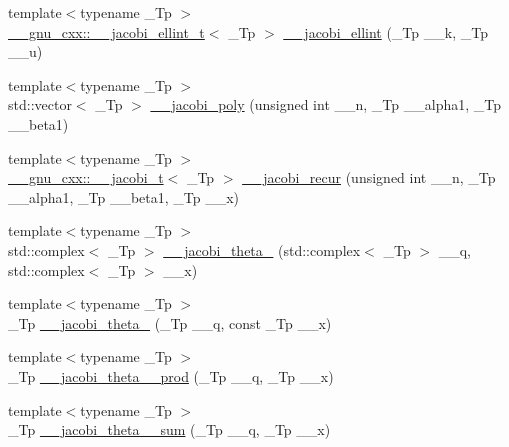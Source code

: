 \begin{DoxyCompactItemize}
\item 
{\footnotesize template$<$typename \+\_\+\+Tp $>$ }\\\hyperlink{struct____gnu__cxx_1_1____jacobi__ellint__t}{\+\_\+\+\_\+gnu\+\_\+cxx\+::\+\_\+\+\_\+jacobi\+\_\+ellint\+\_\+t}$<$ \+\_\+\+Tp $>$ \hyperlink{namespacestd_1_1____detail_a9530210ed172894f6a2e2bf4ef7fd47d}{\+\_\+\+\_\+jacobi\+\_\+ellint} (\+\_\+\+Tp \+\_\+\+\_\+k, \+\_\+\+Tp \+\_\+\+\_\+u)
\item 
{\footnotesize template$<$typename \+\_\+\+Tp $>$ }\\std\+::vector$<$ \+\_\+\+Tp $>$ \hyperlink{namespacestd_1_1____detail_a2d6a3ca0a988687e038522376aa78df1}{\+\_\+\+\_\+jacobi\+\_\+poly} (unsigned int \+\_\+\+\_\+n, \+\_\+\+Tp \+\_\+\+\_\+alpha1, \+\_\+\+Tp \+\_\+\+\_\+beta1)
\item 
{\footnotesize template$<$typename \+\_\+\+Tp $>$ }\\\hyperlink{struct____gnu__cxx_1_1____jacobi__t}{\+\_\+\+\_\+gnu\+\_\+cxx\+::\+\_\+\+\_\+jacobi\+\_\+t}$<$ \+\_\+\+Tp $>$ \hyperlink{namespacestd_1_1____detail_a35edf888e09012d7059e690507ef42ad}{\+\_\+\+\_\+jacobi\+\_\+recur} (unsigned int \+\_\+\+\_\+n, \+\_\+\+Tp \+\_\+\+\_\+alpha1, \+\_\+\+Tp \+\_\+\+\_\+beta1, \+\_\+\+Tp \+\_\+\+\_\+x)
\item 
{\footnotesize template$<$typename \+\_\+\+Tp $>$ }\\std\+::complex$<$ \+\_\+\+Tp $>$ \hyperlink{namespacestd_1_1____detail_aa6cd18ad2e630e4d412007bf2371fb34}{\+\_\+\+\_\+jacobi\+\_\+theta\+\_} (std\+::complex$<$ \+\_\+\+Tp $>$ \+\_\+\+\_\+q, std\+::complex$<$ \+\_\+\+Tp $>$ \+\_\+\+\_\+x)
\item 
{\footnotesize template$<$typename \+\_\+\+Tp $>$ }\\\+\_\+\+Tp \hyperlink{namespacestd_1_1____detail_af98af6bb3dd83f6a28c777d8fbaa5e51}{\+\_\+\+\_\+jacobi\+\_\+theta\+\_} (\+\_\+\+Tp \+\_\+\+\_\+q, const \+\_\+\+Tp \+\_\+\+\_\+x)
\item 
{\footnotesize template$<$typename \+\_\+\+Tp $>$ }\\\+\_\+\+Tp \hyperlink{namespacestd_1_1____detail_a6283a61803d2bc02eebf1d1a12b1bb52}{\+\_\+\+\_\+jacobi\+\_\+theta\+\_\+\_\+prod} (\+\_\+\+Tp \+\_\+\+\_\+q, \+\_\+\+Tp \+\_\+\+\_\+x)
\item 
{\footnotesize template$<$typename \+\_\+\+Tp $>$ }\\\+\_\+\+Tp \hyperlink{namespacestd_1_1____detail_adea964551a6650baebe13574d942bf50}{\+\_\+\+\_\+jacobi\+\_\+theta\+\_\+\_\+sum} (\+\_\+\+Tp \+\_\+\+\_\+q, \+\_\+\+Tp \+\_\+\+\_\+x)

\end{DoxyCompactItemize}
